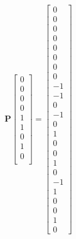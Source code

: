 \[\begin{array}{ll}
	\mathbf{P} \left[ \begin{array}{l}
					0\\
					0\\
					0\\
					0\\
					1\\
					1\\
					0\\
					1\\
					0\\
					\end{array}\right] =  \left[ \begin{array}{l}
											0\\
											0\\
											0\\
											0\\
											0\\
											0\\
											0\\
											0\\
											-1\\
											-1\\
											0\\
											-1\\
											0\\
											1\\
											0\\
											0\\
											1\\
											0\\
											-1\\
											1\\
											0\\
											0\\
											1\\
											0
										\end{array}\right]
	 
   \end{array}
\]



